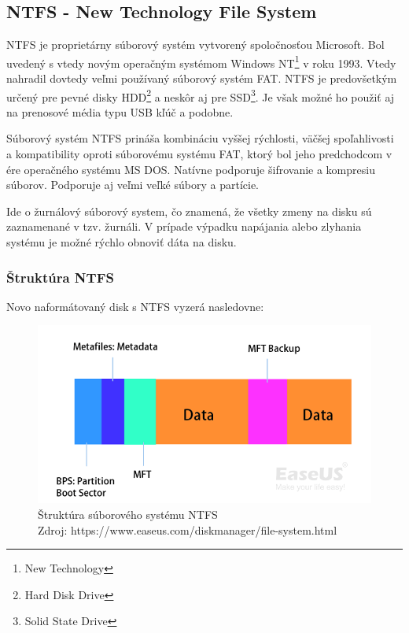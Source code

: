 \documentclass[12pt,oneside,slovak,a4paper]{article}
\begin{document}
\subsection{NTFS - New Technology File System}
NTFS je proprietárny súborový systém vytvorený spoločnosťou Microsoft. Bol uvedený s vtedy novým operačným systémom Windows NT\footnote{New Technology} v roku 1993. Vtedy nahradil dovtedy veľmi používaný súborový systém FAT. NTFS je predovšetkým určený pre pevné disky HDD\footnote{Hard Disk Drive} a neskôr aj pre SSD\footnote{Solid State Drive}. Je však možné ho použiť aj na prenosové média typu USB kľúč a podobne.

Súborový systém NTFS prináša kombináciu vyššej rýchlosti, väčšej spoľahlivosti a kompatibility oproti súborovému systému FAT, ktorý bol jeho predchodcom v ére operačného systému MS DOS. Natívne podporuje šifrovanie a kompresiu súborov. Podporuje aj veľmi veľké súbory a partície.

Ide o žurnálový súborový system, čo znamená, že všetky zmeny na disku sú zaznamenané v tzv. žurnáli. V prípade výpadku napájania alebo zlyhania systému je možné rýchlo obnoviť dáta na disku.

\subsubsection{Štruktúra NTFS}
Novo naformátovaný disk s NTFS vyzerá nasledovne:

\begin{figure}[H]
	\centering
	\captionsetup{justification=centering,margin=2cm}
	\includegraphics[width=\linewidth]{./images/file_system_structure/ntfs-file-system-structure.png}
	\centering
	\caption{Štruktúra súborového systému NTFS \\ Zdroj: https://www.easeus.com/diskmanager/file-system.html}
\end{figure}
\end{document}
